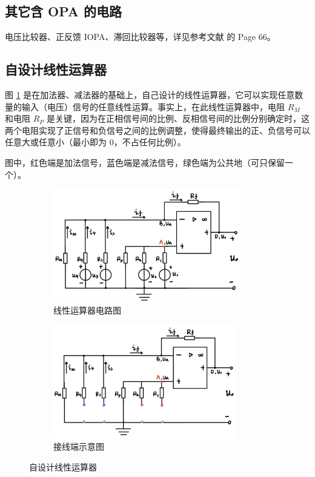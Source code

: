 \documentclass[UTF8]{report}
\theoremstyle{MyLineTheoremStyle} %
\theoremstyle{MyBlockTheoremStyle} %
\theoremstyle{MySubsubsectionStyle} %
\begin{document}
\subsection{其它含 OPA 的电路}

电压比较器、正反馈 IOPA、滞回比较器等，详见参考文献 \cite{电路原理} 的 Page 66。


\subsection{自设计线性运算器}
图 \ref{自设计线性运算器} 是在加法器、减法器的基础上，自己设计的线性运算器，它可以实现任意数量的输入（电压）信号的任意线性运算。事实上，在此线性运算器中，电阻 $R_M$ 和电阻 $R_P$ 是关键，因为在正相信号间的比例、反相信号间的比例分别确定时，这两个电阻实现了正信号和负信号之间的比例调整，使得最终输出的正、负信号可以任意大或任意小（最小即为 0，不占任何比例）。

图中，红色端是加法信号，蓝色端是减法信号，绿色端为公共地（可只保留一个）。

\begin{figure}[H]\centering
\begin{subfigure}[t]{0.49\textwidth}\centering
    \includegraphics[height=140pt]{assets/1,2/线性运算器.png}
    \caption{ 线性运算器电路图 }
\end{subfigure}\begin{subfigure}[t]{0.49\textwidth}\centering
    \includegraphics[height=140pt]{assets/1,2/线性运算器接线端.png}
    \caption{ 接线端示意图 }
\end{subfigure}
\caption{ 自设计线性运算器 }\label{自设计线性运算器}
\end{figure}
\end{document}
